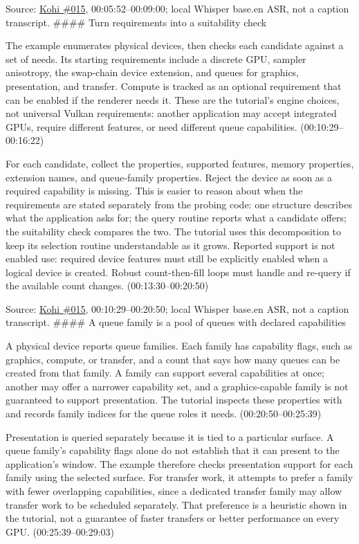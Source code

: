 Source: \href{https://www.youtube.com/watch?v=6Kj3O2Ov1RU}{Kohi \#015}, 00:05:52--00:09:00; local Whisper base.en ASR, not a caption transcript. \#\#\#\# Turn requirements into a suitability check

The example enumerates physical devices, then checks each candidate against a set of needs. Its starting requirements include a discrete GPU, sampler anisotropy, the swap-chain device extension, and queues for graphics, presentation, and transfer. Compute is tracked as an optional requirement that can be enabled if the renderer needs it. These are the tutorial's engine choices, not universal Vulkan requirements: another application may accept integrated GPUs, require different features, or need different queue capabilities. (00:10:29--00:16:22)

For each candidate, collect the properties, supported features, memory properties, extension names, and queue-family properties. Reject the device as soon as a required capability is missing. This is easier to reason about when the requirements are stated separately from the probing code: one structure describes what the application asks for; the query routine reports what a candidate offers; the suitability check compares the two. The tutorial uses this decomposition to keep its selection routine understandable as it grows. Reported support is not enabled use: required device features must still be explicitly enabled when a logical device is created. Robust count-then-fill loops must handle  and re-query if the available count changes. (00:13:30--00:20:50)

Source: \href{https://www.youtube.com/watch?v=6Kj3O2Ov1RU}{Kohi \#015}, 00:10:29--00:20:50; local Whisper base.en ASR, not a caption transcript. \#\#\#\# A queue family is a pool of queues with declared capabilities

A physical device reports queue families. Each family has capability flags, such as graphics, compute, or transfer, and a count that says how many queues can be created from that family. A family can support several capabilities at once; another may offer a narrower capability set, and a graphics-capable family is not guaranteed to support presentation. The tutorial inspects these properties with  and records family indices for the queue roles it needs. (00:20:50--00:25:39)

Presentation is queried separately because it is tied to a particular surface. A queue family's capability flags alone do not establish that it can present to the application's window. The example therefore checks presentation support for each family using the selected surface. For transfer work, it attempts to prefer a family with fewer overlapping capabilities, since a dedicated transfer family may allow transfer work to be scheduled separately. That preference is a heuristic shown in the tutorial, not a guarantee of faster transfers or better performance on every GPU. (00:25:39--00:29:03)

